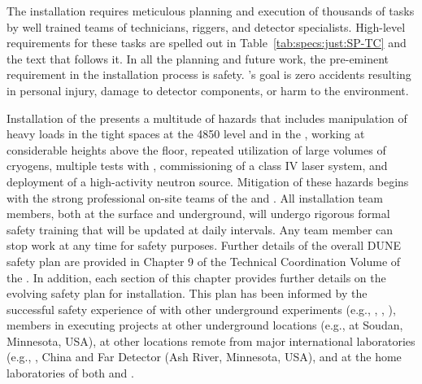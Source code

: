 The installation requires meticulous planning and execution of thousands of tasks by well trained teams of technicians, riggers, and detector specialists. 
High-level requirements for these tasks are spelled out in Table~\ref{tab:specs:just:SP-TC} and the text that follows it. 
In all the planning and future work, the pre-eminent requirement %
in the installation process is safety. 's goal is zero accidents resulting in personal injury, damage to detector components, or harm to the environment.


%

Installation of the %
 presents a multitude of hazards that includes  manipulation of heavy loads in the tight spaces %
at the 4850 level and in the ,  working at considerable heights above the floor, repeated utilization of large volumes of cryogens, multiple tests with , commissioning of a class IV laser system,
 and deployment of a high-activity neutron source. Mitigation of these hazards begins with the strong professional on-site  teams of the  and . %
All installation team members, both at the surface and underground, will undergo rigorous formal safety training that will be updated at daily intervals. Any team member can stop work at any time for safety purposes. Further details of the overall DUNE safety plan are provided in Chapter 9  of the Technical Coordination Volume  of the . In addition, each section of this chapter provides further details on the evolving safety plan for installation. This plan has been informed by the successful safety experience of  with other underground experiments (e.g., , , ),  members in executing projects at other underground locations (e.g.,  at Soudan, Minnesota, USA), at other locations remote from major international laboratories (e.g., , China and  Far Detector (Ash River, Minnesota, USA), and at the home laboratories of both  and .


